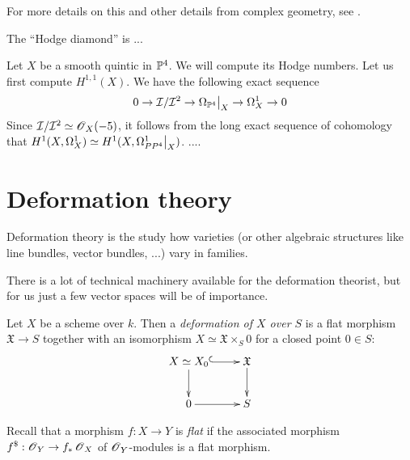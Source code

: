 For more details on this and other details from complex geometry, see  \cite{voisin_complexalg}.

The ``Hodge diamond'' is 
...

\begin{example}
Let $X$ be a smooth quintic in $\mathbb{P}^4$. We will compute its Hodge numbers. Let us first compute $H^{1,1}(X)$. We have the following exact sequence
$$
0 \to \mathcal I/\mathcal I^2 \to \restr{\Omega_{\PP^4}}{X} \to \Omega_X^1 \to 0
$$
Since $\mathcal I/\mathcal I^2 \simeq \operatorname{\mathscr{O}}_X(-5)$, it follows from the long exact sequence of cohomology that $H^1(X,\Omega^1_X) \simeq H^1(X, \restr{\Omega^1_{PP^4}}{X})$. 
....
\end{example}

\section{Deformation theory}

Deformation theory is the study how varieties (or other algebraic structures like line bundles, vector bundles, ...) vary in families. 

There is a lot of technical machinery available for the deformation theorist, but for us just a few vector spaces will be of importance.

\begin{defi}
Let $X$ be a scheme over $k$. Then a \emph{deformation of $X$ over $S$} is a flat morphism $\mathfrak X \to S$ together with an isomorphism $X \simeq \mathfrak X \times_S 0$ for a closed point $0 \in S$:
$$
\xymatrix{
X \simeq X_0 \ar@{^{(}->}[r] \ar[d] &  \mathfrak X \ar[d] \\
0 \ar[r] & S
}
$$
\end{defi}

Recall that a morphism $f:X \to Y$ is \emph{flat} if the associated morphism $f^{\$}:\operatorname{\mathscr{O}}_Y \to f_\ast \operatorname{\mathscr{O}}_X$ of $\operatorname{\mathscr{O}}_Y$-modules is a flat morphism.



